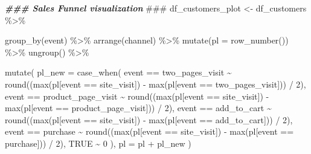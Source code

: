 \documentclass[
]{book}
\newenvironment{Shaded}{\begin{snugshade}}{\end{snugshade}}
\newcommand{\AlertTok}[1]{\textcolor[rgb]{0.94,0.16,0.16}{#1}}
\newcommand{\AttributeTok}[1]{\textcolor[rgb]{0.77,0.63,0.00}{#1}}
\newcommand{\ConstantTok}[1]{\textcolor[rgb]{0.00,0.00,0.00}{#1}}
\newcommand{\DecValTok}[1]{\textcolor[rgb]{0.00,0.00,0.81}{#1}}
\newcommand{\DocumentationTok}[1]{\textcolor[rgb]{0.56,0.35,0.01}{\textbf{\textit{#1}}}}
\newcommand{\FunctionTok}[1]{\textcolor[rgb]{0.00,0.00,0.00}{#1}}
\newcommand{\NormalTok}[1]{#1}
\newcommand{\OtherTok}[1]{\textcolor[rgb]{0.56,0.35,0.01}{#1}}
\newcommand{\SpecialCharTok}[1]{\textcolor[rgb]{0.00,0.00,0.00}{#1}}
\newcommand{\StringTok}[1]{\textcolor[rgb]{0.31,0.60,0.02}{#1}}
\begin{document}
\begin{Shaded}
\begin{Highlighting}[]
\DocumentationTok{\#\#\# Sales Funnel visualization }\AlertTok{\#\#\#}
\NormalTok{df\_customers\_plot }\OtherTok{\textless{}{-}}\NormalTok{ df\_customers }\SpecialCharTok{\%\textgreater{}\%}
    
    \FunctionTok{group\_by}\NormalTok{(event) }\SpecialCharTok{\%\textgreater{}\%}
    \FunctionTok{arrange}\NormalTok{(channel) }\SpecialCharTok{\%\textgreater{}\%}
    \FunctionTok{mutate}\NormalTok{(}\AttributeTok{pl =} \FunctionTok{row\_number}\NormalTok{()) }\SpecialCharTok{\%\textgreater{}\%}
    \FunctionTok{ungroup}\NormalTok{() }\SpecialCharTok{\%\textgreater{}\%}
    
    \FunctionTok{mutate}\NormalTok{(}
        \AttributeTok{pl\_new =} \FunctionTok{case\_when}\NormalTok{(}
\NormalTok{            event }\SpecialCharTok{==} \StringTok{\textquotesingle{}two\_pages\_visit\textquotesingle{}} \SpecialCharTok{\textasciitilde{}} \FunctionTok{round}\NormalTok{((}\FunctionTok{max}\NormalTok{(pl[event }\SpecialCharTok{==} \StringTok{\textquotesingle{}site\_visit\textquotesingle{}}\NormalTok{]) }\SpecialCharTok{{-}} \FunctionTok{max}\NormalTok{(pl[event }\SpecialCharTok{==} \StringTok{\textquotesingle{}two\_pages\_visit\textquotesingle{}}\NormalTok{])) }\SpecialCharTok{/} \DecValTok{2}\NormalTok{),}
\NormalTok{            event }\SpecialCharTok{==} \StringTok{\textquotesingle{}product\_page\_visit\textquotesingle{}} \SpecialCharTok{\textasciitilde{}} \FunctionTok{round}\NormalTok{((}\FunctionTok{max}\NormalTok{(pl[event }\SpecialCharTok{==} \StringTok{\textquotesingle{}site\_visit\textquotesingle{}}\NormalTok{]) }\SpecialCharTok{{-}} \FunctionTok{max}\NormalTok{(pl[event }\SpecialCharTok{==} \StringTok{\textquotesingle{}product\_page\_visit\textquotesingle{}}\NormalTok{])) }\SpecialCharTok{/} \DecValTok{2}\NormalTok{),}
\NormalTok{            event }\SpecialCharTok{==} \StringTok{\textquotesingle{}add\_to\_cart\textquotesingle{}} \SpecialCharTok{\textasciitilde{}} \FunctionTok{round}\NormalTok{((}\FunctionTok{max}\NormalTok{(pl[event }\SpecialCharTok{==} \StringTok{\textquotesingle{}site\_visit\textquotesingle{}}\NormalTok{]) }\SpecialCharTok{{-}} \FunctionTok{max}\NormalTok{(pl[event }\SpecialCharTok{==} \StringTok{\textquotesingle{}add\_to\_cart\textquotesingle{}}\NormalTok{])) }\SpecialCharTok{/} \DecValTok{2}\NormalTok{),}
\NormalTok{            event }\SpecialCharTok{==} \StringTok{\textquotesingle{}purchase\textquotesingle{}} \SpecialCharTok{\textasciitilde{}} \FunctionTok{round}\NormalTok{((}\FunctionTok{max}\NormalTok{(pl[event }\SpecialCharTok{==} \StringTok{\textquotesingle{}site\_visit\textquotesingle{}}\NormalTok{]) }\SpecialCharTok{{-}} \FunctionTok{max}\NormalTok{(pl[event }\SpecialCharTok{==} \StringTok{\textquotesingle{}purchase\textquotesingle{}}\NormalTok{])) }\SpecialCharTok{/} \DecValTok{2}\NormalTok{),}
            \ConstantTok{TRUE} \SpecialCharTok{\textasciitilde{}} \DecValTok{0}
\NormalTok{        ),}
        \AttributeTok{pl =}\NormalTok{ pl }\SpecialCharTok{+}\NormalTok{ pl\_new}
\NormalTok{    )}


\end{Highlighting}
\end{Shaded}
\end{document}
